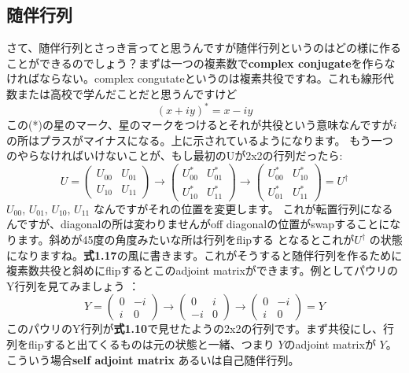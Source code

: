 \subsection{随伴行列}
さて、随伴行列とさっき言ってと思うんですが随伴行列というのはどの様に作ることができるのでしょう？まずは一つの複素数で\textbf{complex conjugate}を作らなければならない。complex congutateというのは複素共役ですね。これも線形代数または高校で学んだことだと思うんですけど
\begin{equation}
(x+i y)^{*}=x-i y
\end{equation}
この(*)の星のマーク、星のマークをつけるとそれが共役という意味なんですが$i$の所はプラスがマイナスになる。上に示されているようになります。
もう一つのやらなければいけないことが、もし最初のUが2x2の行列だったら:
\begin{equation}
U=\left(\begin{array}{ll}
U_{00} & U_{01} \\
U_{10} & U_{11}
\end{array}\right) \rightarrow\left(\begin{array}{cc}
U_{00}^{*} & U_{01}^{*} \\
U_{10}^{*} & U_{11}^{*}
\end{array}\right) \longrightarrow\left(\begin{array}{ll}
U_{00}^{*} & U_{10}^{*} \\
U_{01}^{*} & U_{11}^{*}
\end{array}\right)=U^{\dagger}
\end{equation}
$U_{00}$, $U_{01}$, $U_{10}$, $U_{11}$ なんですがそれの位置を変更します。
これが転置行列になるんですが、diagonalの所は変わりませんがoff diagonalの位置がswapすることになります。斜めが45度の角度みたいな所は行列をflipする
となるとこれが$U^{\dagger}$ の状態になりますね。\textbf{式1.17}の風に書きます。これがそうすると随伴行列を作るために複素数共役と斜めにflipするとこのadjoint matrixができます。例としてパウリのY行列を見てみましょう ：
\begin{equation}
Y=\left(\begin{array}{cc}
0 & -i \\
i & 0
\end{array}\right) \longrightarrow\left(\begin{array}{cc}
0 & i \\
-i & 0
\end{array}\right) \longrightarrow\left(\begin{array}{cc}
0 & -i \\
i & 0
\end{array}\right)=Y
\end{equation}
このパウリのY行列が\textbf{式1.10}で見せたようの2x2の行列です。まず共役にし、行列をflipすると出てくるものは元の状態と一緒、つまり
$Y$のadjoint matrixが $Y$。こういう場合\textbf{self adjoint matrix }あるいは自己随伴行列。
